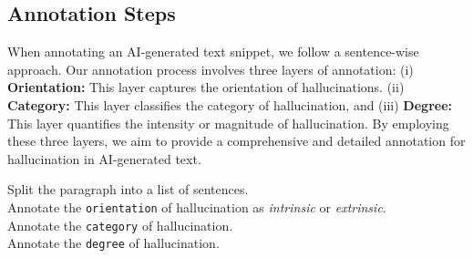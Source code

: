 \subsection{Annotation Steps}
When annotating an AI-generated text snippet, we follow a sentence-wise approach. Our annotation process involves three layers of annotation: (i) \textbf{Orientation:} This layer captures the orientation of hallucinations. (ii) \textbf{Category:} This layer classifies the category of hallucination, and (iii) \textbf{Degree:} This layer quantifies the intensity or magnitude of hallucination. By employing these three layers, we aim to provide a comprehensive and detailed annotation for hallucination in AI-generated text.

\begin{algorithm}[!ht]
\caption{Annotation Guidelines}
Split the paragraph into a list of sentences.\\
Annotate the \texttt{orientation} of hallucination as \emph{intrinsic} or \emph{extrinsic}. \\
Annotate the \texttt{category} of hallucination. 
\\
Annotate the \texttt{degree} of hallucination.
\label{algo:algo1}
\end{algorithm}
\vspace{-3mm}

